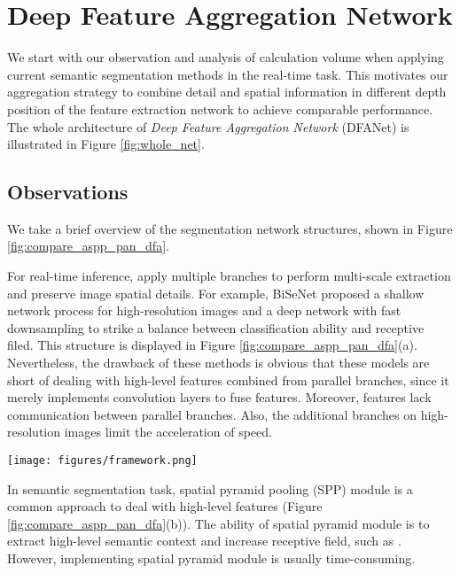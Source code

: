 \documentclass[10pt,twocolumn,letterpaper]{article}
\begin{document}
\section{Deep Feature Aggregation Network}
We start with our observation and analysis of calculation volume when applying current semantic segmentation methods in the real-time task. This motivates our aggregation strategy to combine detail and spatial information in different depth position of the feature extraction network to achieve comparable performance. The whole architecture of \textit{Deep Feature Aggregation Network} (DFANet) is illustrated in Figure \ref{fig:whole_net}.

\subsection{Observations}
We take a brief overview of the segmentation network structures, shown in Figure \ref{fig:compare_aspp_pan_dfa}.

For real-time inference, \cite{ICNet}\cite{BiSeNet} apply multiple branches to perform multi-scale extraction and preserve image spatial details. For example, BiSeNet\cite{BiSeNet} proposed a shallow network process for high-resolution images and a deep network with fast downsampling to strike a balance between classification ability and receptive filed. This structure is displayed in Figure \ref{fig:compare_aspp_pan_dfa}(a).
Nevertheless, the drawback of these methods is obvious that these models are short of dealing with high-level features combined from parallel branches, since it merely implements convolution layers to fuse features. Moreover, features lack communication between parallel branches. Also, the additional branches on high-resolution images limit the acceleration of speed.

\begin{figure*}
\begin{center}
\texttt{[image: figures/framework.png]}
\end{center}
   \caption{Overview of our Deep Feature Aggregation Network: sub-network aggregation, sub-stage aggregation, and dual-path decoder for multi-level feature fusion. In the figure, "C" means concatenation, "xN" is N up-sampling operation.}
\label{fig:whole_net}
\end{figure*}

In semantic segmentation task, spatial pyramid pooling (SPP) module is a common approach to deal with high-level features
\cite{deeplanv3} (Figure \ref{fig:compare_aspp_pan_dfa}(b)). The ability of spatial pyramid module is to extract high-level semantic context and increase receptive field, such as \cite{DeepLab2}\cite{pspnet}\cite{pan}. However, 
implementing spatial pyramid module is usually time-consuming. 
\end{document}
